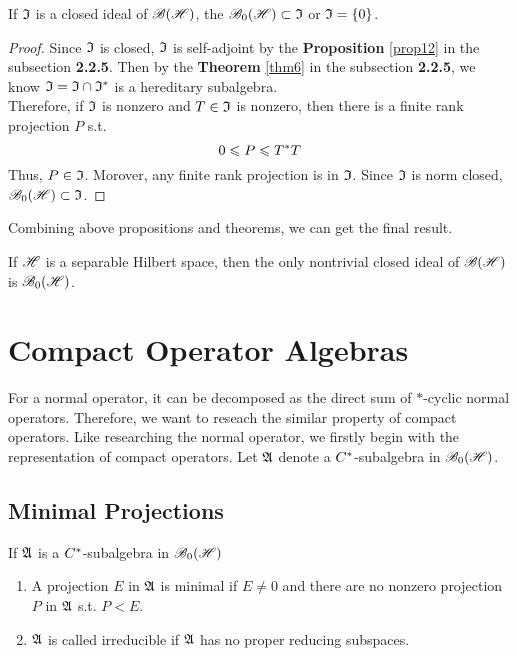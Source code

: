 \documentclass[a4paper,11pt]{report}
\begin{document}
\begin{prop}
	If $\mathfrak{I}$ is a closed ideal of $\mathscr{B(H)}$, the $\mathscr{B}_{0}\mathscr{(H)} \subset \mathfrak{I}$ or $\mathfrak{I} = \{0\}$.
\end{prop}
\begin{proof}
	Since $\mathfrak{I}$ is closed, $\mathfrak{I}$ is self-adjoint by the  \textbf{Proposition} \ref{prop12} in the subsection \textbf{2.2.5}. Then by the \textbf{Theorem} \ref{thm6} in the subsection \textbf{2.2.5}, we know $\mathfrak{I} = \mathfrak{I} \cap \mathfrak{I}^{*}$ is a hereditary subalgebra. \\
	Therefore, if $\mathfrak{I}$ is nonzero and $T \in \mathfrak{I}$ is nonzero, then there is a finite rank projection $P$ s.t.
	\begin{equation*}
		0 \leqslant P \leqslant T^{*}T
	\end{equation*}
	Thus, $P \in \mathfrak{I}$. Morover, any finite rank projection is in $\mathfrak{I}$. Since $\mathfrak{I}$ is norm closed, $\mathscr{B}_{0}\mathscr{(H)} \subset \mathfrak{I}$.
\end{proof}

Combining above propositions and theorems, we can get the final result.
\begin{cor}
	If $\mathscr{H}$ is a separable Hilbert space, then the only nontrivial closed ideal of $\mathscr{B(H)}$ is $\mathscr{B}_{0}\mathscr{(H)}$.
\end{cor}

\section{Compact Operator Algebras}

For a normal operator, it can be decomposed as the direct sum of $*$-cyclic normal operators. Therefore, we want to reseach the similar property of compact operators. Like researching the normal operator, we firstly begin with the representation of compact operators. Let $\mathfrak{A}$ denote a $C^{*}$-subalgebra in $\mathscr{B}_{0}\mathscr{(H)}$.

\subsection{Minimal Projections}

\begin{defn}
	If $\mathfrak{A}$ is a $C^{*}$-subalgebra in $\mathscr{B}_{0}\mathscr{(H)}$
	\begin{enumerate}[label=\arabic*)]
		\item A projection $E$ in $\mathfrak{A}$ is minimal if $E \neq 0$ and there are no nonzero projection $P$ in $\mathfrak{A}$ s.t. $P < E$.
		\item $\mathfrak{A}$ is called irreducible if $\mathfrak{A}$ has no proper reducing subspaces.
	\end{enumerate}
\end{defn}
\end{document}
